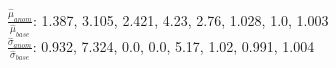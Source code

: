 $\frac{\hat\mu_{anom}}{\hat\mu_{base}}$: 1.387, 3.105, 2.421, 4.23, 2.76, 1.028, 1.0, 1.003\\$\frac{\hat\sigma_{anom}}{\hat\sigma_{base}}$: 0.932, 7.324, 0.0, 0.0, 5.17, 1.02, 0.991, 1.004